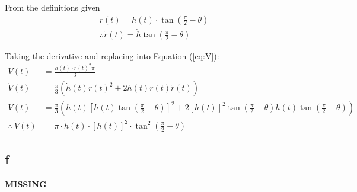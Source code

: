 From the definitions given
\begin{equation*}
\begin{split}
    r(t) = h(t) \cdot \tan\left( \frac{\pi}{2} - \theta \right) \\
    \therefore \dot{r}(t) = \dot{h}\tan\left( \frac{\pi}{2} - \theta \right)
\end{split}
\end{equation*}

Taking the derivative and replacing into Equation (\ref{eq:V}):
\begin{equation}\begin{split}
    V(t) &= \frac{h(t) \cdot {r(t)}^2 \pi}{3} \\
    \dot{V}(t) &= \frac{\pi}{3} \left(
        \dot{h}(t) {r(t)}^2 + 2h(t)r(t) \dot{r}(t)
    \right) \\
    \dot{V}(t) &= \frac{\pi}{3} \left(
        \dot{h}(t) \left[
             h(t)\tan\left( \frac{\pi}{2} - \theta \right)
        \right]^2
        + 2{\left[h(t)\right]}^2 \tan\left( \frac{\pi}{2} - \theta \right) \dot{h}(t) \tan\left( \frac{\pi}{2} - \theta \right)
    \right) \\
    \therefore \ \dot{V}(t) &= \pi \cdot \dot{h}(t) \cdot {\left[ h(t) \right]}^2 \cdot \tan^2\left( \frac{\pi}{2} - \theta \right)
\end{split}
\end{equation}

\subsection{f}

\textbf{MISSING}